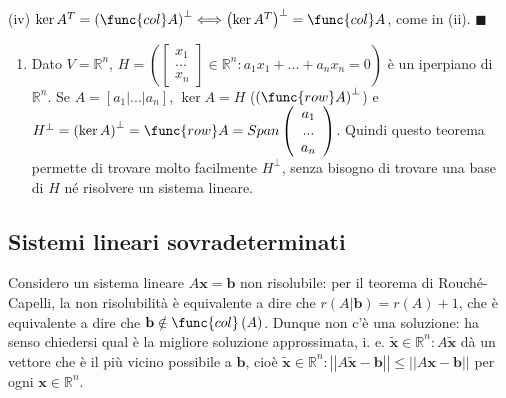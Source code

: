 \documentclass{article}
\begin{document}
(iv) $\ker A^{T}=\left( \func{col}A\right) ^{\perp }\Longleftrightarrow
\left( \ker A^{T}\right) ^{\perp }=\func{col}A$, come in (ii). $\blacksquare 
$

\begin{enumerate}
\item Dato $V=%
\mathbb{R}
^{n}$, $H=\left( \left[ 
\begin{array}{c}
x_{1} \\ 
... \\ 
x_{n}%
\end{array}%
\right] \in 
\mathbb{R}
^{n}:a_{1}x_{1}+...+a_{n}x_{n}=0\right) $ \`{e} un iperpiano di $%
\mathbb{R}
^{n}$. Se $A=\left[ a_{1}|...|a_{n}\right] $, $\ker A=H$ ($\left( \func{row}%
A\right) ^{\perp }$) e $H^{\perp }=\left( \ker A\right) ^{\perp }=\func{row}%
A=Span\left( 
\begin{array}{c}
a_{1} \\ 
... \\ 
a_{n}%
\end{array}%
\right) $. Quindi questo teorema permette di trovare molto facilmente $%
H^{\perp }$, senza bisogno di trovare una base di $H$ n\'{e} risolvere un
sistema lineare.
\end{enumerate}

\subsection{Sistemi lineari sovradeterminati}

Considero un sistema lineare $A\mathbf{x=b}$ non risolubile: per il teorema
di Rouch\'{e}-Capelli, la non risolubilit\`{a} \`{e} equivalente a dire che $%
r\left( A|\mathbf{b}\right) =r\left( A\right) +1$, che \`{e} equivalente a
dire che $\mathbf{b}\notin \func{col}\left( A\right) $. Dunque non c'\`{e}
una soluzione: ha senso chiedersi qual \`{e} la migliore soluzione
approssimata, i. e. $\mathbf{\tilde{x}\in 
\mathbb{R}
}^{n}:A\mathbf{\tilde{x}}$ d\`{a} un vettore che \`{e} il pi\`{u} vicino
possibile a $\mathbf{b}$, cio\`{e} $\mathbf{\tilde{x}\in 
\mathbb{R}
}^{n}:\left\vert \left\vert A\mathbf{\tilde{x}-b}\right\vert \right\vert
\leq \left\vert \left\vert A\mathbf{x-b}\right\vert \right\vert $ per ogni $%
\mathbf{x\in 
\mathbb{R}
}^{n}$.
\end{document}
